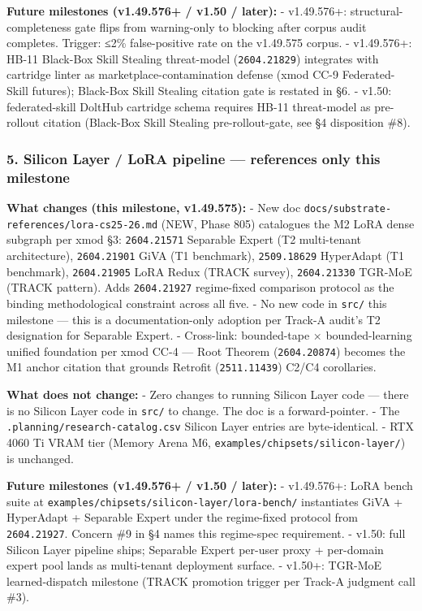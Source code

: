 \documentclass[11pt,letterpaper]{article}
\newcommand{\arxivid}[1]{\texttt{\textcolor{accent}{#1}}}
\begin{document}
\textbf{Future milestones (v1.49.576+ / v1.50 / later):} - v1.49.576+:
structural-completeness gate flips from warning-only to blocking after
corpus audit completes. Trigger: ≤2\% false-positive rate on the
v1.49.575 corpus. - v1.49.576+: HB-11 Black-Box Skill Stealing
threat-model (\arxivid{2604.21829}) integrates with cartridge linter as
marketplace-contamination defense (xmod CC-9 Federated-Skill futures);
Black-Box Skill Stealing citation gate is restated in §6. - v1.50:
federated-skill DoltHub cartridge schema requires HB-11 threat-model as
pre-rollout citation (Black-Box Skill Stealing pre-rollout-gate, see §4
disposition \#8).

\subsubsection{5. Silicon Layer / LoRA pipeline --- references only this
milestone}

\textbf{What changes (this milestone, v1.49.575):} - New doc
\texttt{docs/substrate-references/lora-cs25-26.md} (NEW, Phase 805)
catalogues the M2 LoRA dense subgraph per xmod §3: \arxivid{2604.21571}
Separable Expert (T2 multi-tenant architecture), \arxivid{2604.21901}
GiVA (T1 benchmark), \arxivid{2509.18629} HyperAdapt (T1 benchmark),
\arxivid{2604.21905} LoRA Redux (TRACK survey), \arxivid{2604.21330}
TGR-MoE (TRACK pattern). Adds \arxivid{2604.21927} regime-fixed
comparison protocol as the binding methodological constraint across all
five. - No new code in \texttt{src/} this milestone --- this is a
documentation-only adoption per Track-A audit's T2 designation for
Separable Expert. - Cross-link: bounded-tape × bounded-learning unified
foundation per xmod CC-4 --- Root Theorem (\arxivid{2604.20874}) becomes
the M1 anchor citation that grounds Retrofit (\arxivid{2511.11439}) C2/C4
corollaries.

\textbf{What does not change:} - Zero changes to running Silicon Layer
code --- there is no Silicon Layer code in \texttt{src/} to change. The
doc is a forward-pointer. - The \texttt{.planning/research-catalog.csv}
Silicon Layer entries are byte-identical. - RTX 4060 Ti VRAM tier
(Memory Arena M6, \texttt{examples/chipsets/silicon-layer/}) is
unchanged.

\textbf{Future milestones (v1.49.576+ / v1.50 / later):} - v1.49.576+:
LoRA bench suite at \texttt{examples/chipsets/silicon-layer/lora-bench/}
instantiates GiVA + HyperAdapt + Separable Expert under the regime-fixed
protocol from \arxivid{2604.21927}. Concern \#9 in §4 names this
regime-spec requirement. - v1.50: full Silicon Layer pipeline ships;
Separable Expert per-user proxy + per-domain expert pool lands as
multi-tenant deployment surface. - v1.50+: TGR-MoE learned-dispatch
milestone (TRACK promotion trigger per Track-A judgment call \#3).
\end{document}

